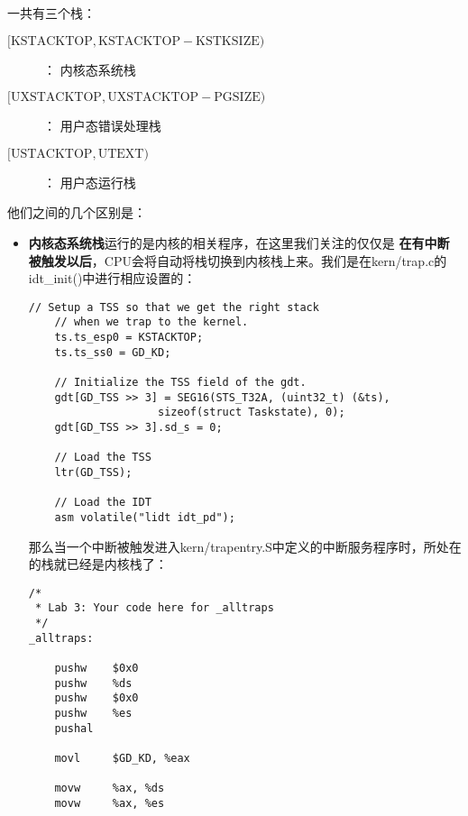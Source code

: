 \documentclass{article}
\newcommand{\highlight}[1]{{\bfseries \color{red}  #1}}
\newcommand{\funcname}[1]{{\ttfamily \small #1}}
\begin{document}
\begin{CJK*}{UTF8}{gkai}
一共有三个栈：

\begin{description}
\item[$ [\mathrm{KSTACKTOP}, \mathrm{KSTACKTOP} - \mathrm{KSTKSIZE}) $] ：\newline
内核态系统栈

\item[$ [\mathrm{UXSTACKTOP}, \mathrm{UXSTACKTOP} - \mathrm{PGSIZE}) $] ：\newline
用户态错误处理栈

\item[$ [\mathrm{USTACKTOP}, \mathrm{UTEXT}) $] ：\newline
用户态运行栈

\end{description}

他们之间的几个区别是：

\begin{itemize}
\item{\highlight{内核态系统栈}运行的是内核的相关程序，在这里我们关注的仅仅是\highlight{在有中断被触发以后}，CPU会将自动将栈切换到内核栈上来。我们是在kern/trap.c的\funcname{idt\_init()}中进行相应设置的：

\begin{lstlisting}[style=ccode, title={\scriptsize \ttfamily \bfseries kern/trap.c: idt\_init()}]
	// Setup a TSS so that we get the right stack
	// when we trap to the kernel.
	ts.ts_esp0 = KSTACKTOP;
	ts.ts_ss0 = GD_KD;

	// Initialize the TSS field of the gdt.
	gdt[GD_TSS >> 3] = SEG16(STS_T32A, (uint32_t) (&ts),
					sizeof(struct Taskstate), 0);
	gdt[GD_TSS >> 3].sd_s = 0;

	// Load the TSS
	ltr(GD_TSS);

	// Load the IDT
	asm volatile("lidt idt_pd");
\end{lstlisting}

那么当一个中断被触发进入kern/trapentry.S中定义的中断服务程序时，所处在的栈就已经是内核栈了：

\begin{lstlisting}[style=acode, title={\scriptsize \ttfamily \bfseries kern/trapentry.S}]
/*
 * Lab 3: Your code here for _alltraps
 */
_alltraps:

    pushw    $0x0
    pushw    %ds
    pushw    $0x0
    pushw    %es
    pushal

    movl     $GD_KD, %eax
    
    movw     %ax, %ds
    movw     %ax, %es


\end{lstlisting}}
\end{itemize}
\end{CJK*}
\end{document}
